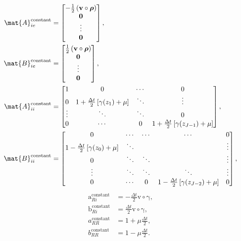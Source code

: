 \documentclass{jpmarticle}
\renewcommand{\vec}[1]{\boldsymbol{\mathrm{#1}}}
\begin{document}
\begin{equation}
  \begin{split}
    \mat{A}_{ie}^{\text{constant}} &=
    \begin{bmatrix}
      - \frac{1}{2} \left(\vec{v} \circ \vec{\rho}\right)
      \\
      \vec{0}
      \\
      \vdots
      \\
      \vec{0}
    \end{bmatrix},
    \\
    \mat{B}_{ie}^{\text{constant}} &=
    \begin{bmatrix}
      \frac{1}{2} \left(\vec{v} \circ \vec{\rho}\right)
      \\
      \vec{0}
      \\
      \vdots
      \\
      \vec{0}
    \end{bmatrix},
    \\
    \mat{A}_{ii}^{\text{constant}} &=
    \begin{bmatrix}
      1 & 0 & \cdots & 0
      \\
      0 & 1 + \frac{\Delta t}{2} \left[\gamma(z_1) + \mu\right] &
      \ddots & \vdots
      \\
      \vdots & \ddots & \ddots & 0
      \\
      0 & \cdots & 0 &
      1 + \frac{\Delta t}{2} \left[\gamma(z_{J - 1}) + \mu\right]
    \end{bmatrix},
    \\
    \mat{B}_{ii}^{\text{constant}} &=
    \begin{bmatrix}
      0 & \cdots & \cdots & \cdots & 0
      \\
      1 - \frac{\Delta t}{2} \left[\gamma(z_0) + \mu\right] & \ddots &
      & & \vdots
      \\
      0 & \ddots & \ddots & & \vdots
      \\
      \vdots & \ddots & \ddots & \ddots & \vdots
      \\
      0 & \cdots & 0 &
      1 - \frac{\Delta t}{2} \left[\gamma(z_{J - 2}) + \mu\right] & 0
    \end{bmatrix},
  \end{split}
\end{equation}
\begin{equation}
  \begin{split}
    \vec{a}_{Ri}^{\text{constant}} &=
    - \frac{\Delta t}{2} \vec{v} \circ \vec{\gamma},
    \\
    \vec{b}_{Ri}^{\text{constant}} &=
    \frac{\Delta t}{2} \vec{v} \circ \vec{\gamma},
    \\
    a_{RR}^{\text{constant}} &=
    1 + \mu \frac{\Delta t}{2},
    \\
    b_{RR}^{\text{constant}} &=
    1 - \mu \frac{\Delta t}{2}.
  \end{split}
\end{equation}
\end{document}
